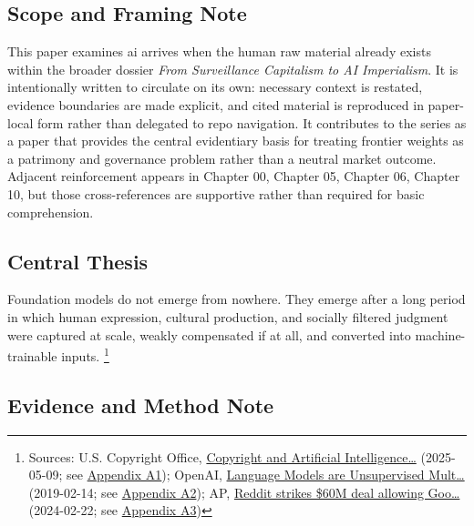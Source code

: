 \documentclass[
  american,
  11pt,
  letterpaper,
]{article}
\begin{document}
\subsection{Scope and Framing Note}\label{scope-and-framing-note-4}

This paper examines ai arrives when the human raw material already
exists within the broader dossier \emph{From Surveillance Capitalism to
AI Imperialism}. It is intentionally written to circulate on its own:
necessary context is restated, evidence boundaries are made explicit,
and cited material is reproduced in paper-local form rather than
delegated to repo navigation. It contributes to the series as a paper
that provides the central evidentiary basis for treating frontier
weights as a patrimony and governance problem rather than a neutral
market outcome. Adjacent reinforcement appears in Chapter 00, Chapter
05, Chapter 06, Chapter 10, but those cross-references are supportive
rather than required for basic comprehension.

\subsection{Central Thesis}\label{central-thesis-4}

Foundation models do not emerge from nowhere. They emerge after a long
period in which human expression, cultural production, and socially
filtered judgment were captured at scale, weakly compensated if at all,
and converted into machine-trainable inputs. \footnote{Sources: U.S.
  Copyright Office,
  \href{https://copyright.gov/ai/Copyright-and-Artificial-Intelligence-Part-3-Generative-AI-Training-Report-Pre-Publication-Version.pdf}{Copyright
  and Artificial Intelligence\ldots{}} (2025-05-09; see
  \hyperref[ch-04-appendix-a1-copyright-and-artificial-intelligence-part-3-generative-ai-training-pre-publication-version]{Appendix
  A1}); OpenAI,
  \href{https://cdn.openai.com/better-language-models/language_models_are_unsupervised_multitask_learners.pdf}{Language
  Models are Unsupervised Mult\ldots{}} (2019-02-14; see
  \hyperref[ch-04-appendix-a2-language-models-are-unsupervised-multitask-learners]{Appendix
  A2}); AP,
  \href{https://apnews.com/article/a7f131c7cb4225307134ef21d3c6a708}{Reddit
  strikes \$60M deal allowing Goo\ldots{}} (2024-02-22; see
  \hyperref[ch-04-appendix-a3-reddit-strikes-60m-deal-allowing-google-to-train-ai-models-on-its-posts-unveils-ipo-plans]{Appendix
  A3})}

\subsection{Evidence and Method Note}\label{evidence-and-method-note-4}
\end{document}
